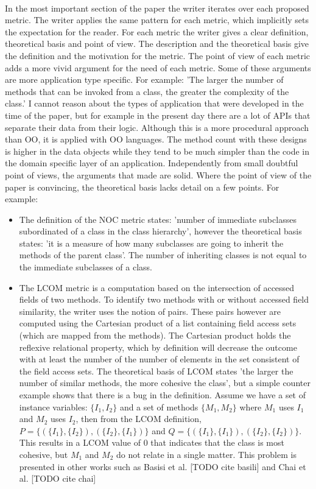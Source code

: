 \paragraph{}
In the most important section of the paper the writer iterates over each proposed metric. The writer applies the
same pattern for each metric, which implicitly sets the expectation for the reader. For each metric the writer gives a
clear definition, theoretical basis and point of view. The description and the theoretical basis give the definition and
the motivation for the metric. The point of view of each metric adds a more vivid argument for the need of each metric.
Some of these arguments are more application type specific. For example: 'The larger the number of methods that can be
invoked from a class, the greater the complexity of the class.' I cannot reason about the types of application that were
developed in the time of the paper, but for example in the present day there are a lot of APIs that separate their data
from their logic. Although this is a more procedural approach than OO, it is applied with OO languages. The method count
with these designs is higher in the data objects while they tend to be much simpler than the code in the domain specific
layer of an application. Independently from small doubtful point of views, the arguments that made are solid.
Where the point of view of the paper is convincing, the theoretical basis lacks detail on a few points. For example:

\begin{itemize}
\item
The definition of the NOC metric states: 'number of immediate subclasses subordinated of a class in the class
hierarchy', however the theoretical basis states: 'it is a measure of how many subclasses are going to inherit
the methods of the parent class'. The number of inheriting classes is not equal to the immediate subclasses of a
class.
\item
The LCOM metric is a computation based on the intersection of accessed fields of two methods. To identify two
methods with or without accessed field similarity, the writer uses the notion of pairs. These pairs however are
computed using the Cartesian product of a list containing field access sets (which are mapped from the
methods). The Cartesian product holds the reflexive relational property, which by definition will decrease
the outcome with at least the number of the number of elements in the set consistent of the field access sets.
The theoretical basis of LCOM states 'the larger the number of similar methods, the more cohesive the class',
but a simple counter example shows that there is a bug in the definition. Assume we have a set of instance
variables: $\{I_1, I_2\}$ and a set of methods $\{M_1, M_2\}$ where $M_1$ uses $I_1$ and $M_2$ uses $I_2$, then from
the LCOM definition, $P = \{( \{I_1\}, \{I_2\} ), ( \{I_2\}, \{I_1\} ) \}$ and
$Q = \{( \{I_1\}, \{I_1\} ), ( \{I_2\}, \{I_2\} ) \}$. This results in a LCOM value of $0$ that indicates that
the class is most cohesive, but $M_1$ and $M_2$ do not relate in a single matter. This problem is presented in other
works such as Basisi et al. [TODO cite basili] and Chai et al. [TODO cite chai]
\end{itemize}

